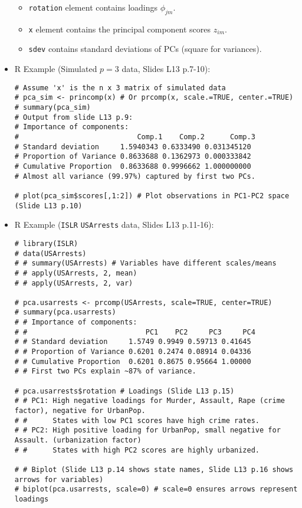 \documentclass[12pt,a4paper]{article}
\newcommand{\Rpackage}[1]{\texttt{#1}} %
\newcommand{\Robject}[1]{\texttt{#1}} %
\begin{document}
\begin{itemize}
\begin{itemize}
                    \item \Robject{rotation} element contains loadings $\phi_{jm}$.
                    \item \Robject{x} element contains the principal component scores $z_{im}$.
                    \item \Robject{sdev} contains standard deviations of PCs (square for variances).
                \end{itemize}
            \item R Example (Simulated $p=3$ data, Slides L13 p.7-10):
\begin{lstlisting}[caption={PCA on Simulated 3D Data (Slides L13 p.9-10)}]
# Assume 'x' is the n x 3 matrix of simulated data
# pca_sim <- princomp(x) # Or prcomp(x, scale.=TRUE, center.=TRUE)
# summary(pca_sim)
# Output from slide L13 p.9:
# Importance of components:
#                            Comp.1    Comp.2      Comp.3
# Standard deviation     1.5940343 0.6333490 0.031345120
# Proportion of Variance 0.8633688 0.1362973 0.000333842
# Cumulative Proportion  0.8633688 0.9996662 1.000000000
# Almost all variance (99.97%) captured by first two PCs.

# plot(pca_sim$scores[,1:2]) # Plot observations in PC1-PC2 space (Slide L13 p.10)
\end{lstlisting}
            \item R Example (\Rpackage{ISLR} \Robject{USArrests} data, Slides L13 p.11-16):
\begin{lstlisting}[caption={PCA on USArrests Data (Slides L13 p.13-16)}]
# library(ISLR)
# data(USArrests)
# # summary(USArrests) # Variables have different scales/means
# # apply(USArrests, 2, mean)
# # apply(USArrests, 2, var)

# pca.usarrests <- prcomp(USArrests, scale=TRUE, center=TRUE)
# summary(pca.usarrests)
# # Importance of components:
# #                            PC1    PC2     PC3     PC4
# # Standard deviation     1.5749 0.9949 0.59713 0.41645
# # Proportion of Variance 0.6201 0.2474 0.08914 0.04336
# # Cumulative Proportion  0.6201 0.8675 0.95664 1.00000
# # First two PCs explain ~87% of variance.

# pca.usarrests$rotation # Loadings (Slide L13 p.15)
# # PC1: High negative loadings for Murder, Assault, Rape (crime factor), negative for UrbanPop.
# #      States with low PC1 scores have high crime rates.
# # PC2: High positive loading for UrbanPop, small negative for Assault. (urbanization factor)
# #      States with high PC2 scores are highly urbanized.

# # Biplot (Slide L13 p.14 shows state names, Slide L13 p.16 shows arrows for variables)
# biplot(pca.usarrests, scale=0) # scale=0 ensures arrows represent loadings
\end{lstlisting}
        \end{itemize}
\end{document}
